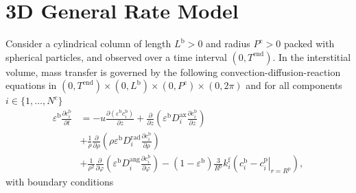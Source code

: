 \documentclass{article}
\begin{document}
\section*{3D General Rate Model}
Consider a cylindrical column of length $L^{\mathrm{b}} > 0$ and radius $P^{\mathrm{c}} > 0$ packed with spherical particles, and observed over a time interval $(0, T^{\mathrm{end}})$.
In the interstitial volume, mass transfer is governed by the following convection-diffusion-reaction equations in $(0, T^{\mathrm{end}})\times (0, L^{\mathrm{b}})\times (0, P^{\mathrm{c}})\times (0, 2\pi)$ and for all components $i\in\{1, \dots, N^{\mathrm{c}} \}$
\begin{align}
    \varepsilon^{\mathrm{b}} \frac{\partial c^{\mathrm{b}}_{i}}{\partial t}
    &= - u \frac{\partial \left( \varepsilon^{\mathrm{b}} c^{\mathrm{b}}_{i} \right)}{\partial z}
        + \frac{\partial}{\partial z} \left( \varepsilon^{\mathrm{b}} D^{\mathrm{ax}}_{i} \frac{\partial c^{\mathrm{b}}_{i}}{\partial z} \right) \nonumber
    \\
    &+ \frac{1}{\rho} \frac{\partial}{\partial \rho} \left( \rho \varepsilon^{\mathrm{b}} D^{\mathrm{rad}}_{i} \frac{\partial c^{\mathrm{b}}_{i}}{\partial \rho} \right) \nonumber
    \\
    &+ \frac{1}{\rho^2} \frac{\partial}{\partial \varphi} \left( \varepsilon^{\mathrm{b}} D^{\mathrm{ang}}_{i} \frac{\partial c^{\mathrm{b}}_{i}}{\partial \varphi} \right)
        - \left(1 - \varepsilon^{\mathrm{b}} \right) \frac{3}{R^{\mathrm{p}}} k^{\mathrm{f}}_{i} \left(c^{\mathrm{b}}_{i} - \left. c^{\mathrm{p}}_{i} \right|_{r = R^{\mathrm{p}}} \right),
\end{align}
with boundary conditions
\end{document}
